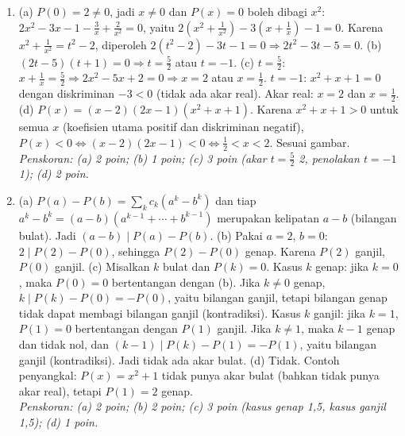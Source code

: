 \documentclass[a4paper,11pt]{article}
\newcounter{no}
\begin{document}
\begin{enumerate}[leftmargin=2em,itemsep=3pt,topsep=2pt]
\item[\textbf{4.}] (a) $P(0)=2\neq0$, jadi $x\neq0$ dan $P(x)=0$ boleh dibagi $x^2$: $2x^2-3x-1-\frac3x+\frac2{x^2}=0$, yaitu $2\left(x^2+\frac1{x^2}\right)-3\left(x+\frac1x\right)-1=0$. Karena $x^2+\frac1{x^2}=t^2-2$, diperoleh $2(t^2-2)-3t-1=0\Rightarrow2t^2-3t-5=0$. (b) $(2t-5)(t+1)=0\Rightarrow t=\frac52$ atau $t=-1$. (c) $t=\frac52$: $x+\frac1x=\frac52\Rightarrow2x^2-5x+2=0\Rightarrow x=2$ atau $x=\frac12$. $t=-1$: $x^2+x+1=0$ dengan diskriminan $-3<0$ (tidak ada akar real). Akar real: $x=2$ dan $x=\frac12$. (d) $P(x)=(x-2)(2x-1)(x^2+x+1)$. Karena $x^2+x+1>0$ untuk semua $x$ (koefisien utama positif dan diskriminan negatif), $P(x)<0\iff(x-2)(2x-1)<0\iff\frac12<x<2$. Sesuai gambar. \\ \textit{Penskoran: (a) 2 poin; (b) 1 poin; (c) 3 poin (akar $t=\frac52$ 2, penolakan $t=-1$ 1); (d) 2 poin.}
\item[\textbf{5.}] (a) $P(a)-P(b)=\sum_{k}c_k(a^k-b^k)$ dan tiap $a^k-b^k=(a-b)(a^{k-1}+\cdots+b^{k-1})$ merupakan kelipatan $a-b$ (bilangan bulat). Jadi $(a-b)\mid P(a)-P(b)$. (b) Pakai $a=2$, $b=0$: $2\mid P(2)-P(0)$, sehingga $P(2)-P(0)$ genap. Karena $P(2)$ ganjil, $P(0)$ ganjil. (c) Misalkan $k$ bulat dan $P(k)=0$. Kasus $k$ genap: jika $k=0$, maka $P(0)=0$ bertentangan dengan (b). Jika $k\neq0$ genap, $k\mid P(k)-P(0)=-P(0)$, yaitu bilangan ganjil, tetapi bilangan genap tidak dapat membagi bilangan ganjil (kontradiksi). Kasus $k$ ganjil: jika $k=1$, $P(1)=0$ bertentangan dengan $P(1)$ ganjil. Jika $k\neq1$, maka $k-1$ genap dan tidak nol, dan $(k-1)\mid P(k)-P(1)=-P(1)$, yaitu bilangan ganjil (kontradiksi). Jadi tidak ada akar bulat. (d) Tidak. Contoh penyangkal: $P(x)=x^2+1$ tidak punya akar bulat (bahkan tidak punya akar real), tetapi $P(1)=2$ genap. \\ \textit{Penskoran: (a) 2 poin; (b) 2 poin; (c) 3 poin (kasus genap 1,5, kasus ganjil 1,5); (d) 1 poin.}
\end{enumerate}
\end{document}
